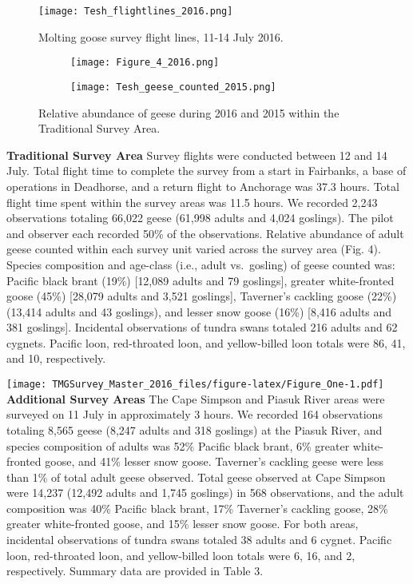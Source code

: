\documentclass[]{article}
\begin{document}
\begin{figure}[h]
\texttt{[image: Tesh\_flightlines\_2016.png]}
\caption{Molting goose survey flight lines, 11-14 July 2016.}
\end{figure}

\begin{figure}
\centering
\begin{subfigure}[h]{0.85\textwidth}
\texttt{[image: Figure\_4\_2016.png]}
\end{subfigure}
\begin{subfigure}[h]{0.85\textwidth}
\texttt{[image: Tesh\_geese\_counted\_2015.png]}
\end{subfigure}
\caption{Relative abundance of geese during 2016 and 2015 within the Traditional Survey Area.}
\end{figure}

\textbf{Traditional Survey Area}\newline
Survey flights were conducted between 12 and 14 July. Total flight time
to complete the survey from a start in Fairbanks, a base of operations
in Deadhorse, and a return flight to Anchorage was 37.3 hours. Total
flight time spent within the survey areas was 11.5 hours. We recorded
2,243 observations totaling 66,022 geese (61,998 adults and 4,024
goslings). The pilot and observer each recorded 50\% of the
observations. Relative abundance of adult geese counted within each
survey unit varied across the survey area (Fig. 4). Species composition
and age-class (i.e., adult vs.~gosling) of geese counted was: Pacific
black brant (19\%) {[}12,089 adults and 79 goslings{]}, greater
white-fronted goose (45\%) {[}28,079 adults and 3,521 goslings{]},
Taverner's cackling goose (22\%) (13,414 adults and 43 goslings), and
lesser snow goose (16\%) {[}8,416 adults and 381 goslings{]}. Incidental
observations of tundra swans totaled 216 adults and 62 cygnets. Pacific
loon, red-throated loon, and yellow-billed loon totals were 86, 41, and
10, respectively.

\texttt{[image: TMGSurvey\_Master\_2016\_files/figure-latex/Figure\_One-1.pdf]}
\textbf{Additional Survey Areas}\newline
The Cape Simpson and Piasuk River areas were surveyed on 11 July in
approximately 3 hours. We recorded 164 observations totaling 8,565 geese
(8,247 adults and 318 goslings) at the Piasuk River, and species
composition of adults was 52\% Pacific black brant, 6\% greater
white-fronted goose, and 41\% lesser snow goose. Taverner's cackling
geese were less than 1\% of total adult geese observed. Total geese
observed at Cape Simpson were 14,237 (12,492 adults and 1,745 goslings)
in 568 observations, and the adult composition was 40\% Pacific black
brant, 17\% Taverner's cackling goose, 28\% greater white-fronted goose,
and 15\% lesser snow goose. For both areas, incidental observations of
tundra swans totaled 38 adults and 6 cygnet. Pacific loon, red-throated
loon, and yellow-billed loon totals were 6, 16, and 2, respectively.
Summary data are provided in Table 3.
\end{document}
